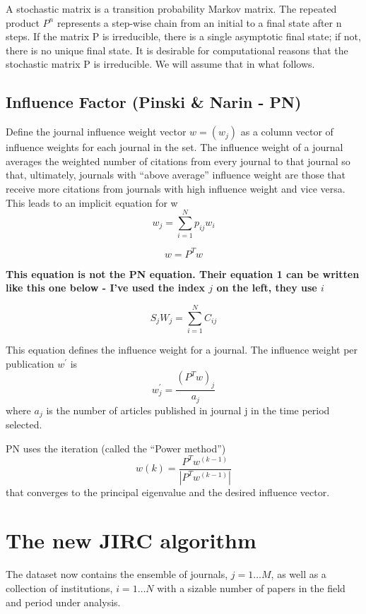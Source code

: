 \documentclass[10pt]{article}
\begin{document}
A stochastic matrix is a transition probability Markov matrix. The repeated product $P^n$ represents a step-wise chain from an initial to a final state
after n steps. If the matrix P is irreducible, there is a single asymptotic final state; if
not, there is no unique final state. It is desirable for computational reasons that the stochastic matrix P  is irreducible. We will assume that in what follows.

\subsection{Influence Factor (Pinski \& Narin - PN)}
Define the journal influence weight vector
$w = (w_j)$ as a column vector of influence weights for each journal in the set. The influence
weight of a journal averages the weighted number of citations from every journal to that
journal so that, ultimately, journals with ``above average'' influence weight are those that
receive more citations from journals with high influence weight and vice versa. This
leads to an implicit equation for w
\begin{equation}
w_j =   \sum_{i=1}^{N}p_{ij}w_i
\end{equation}

\begin{equation}
w = P^Tw
\end{equation}

\textbf{This equation is not the PN equation. Their equation 1 can be written like this one below - I've used the index $j$ on the left, they use $i$}

\begin{equation}
S_j W_j = \sum_{i=1}^{N}C_{ij}
\end{equation}



This equation defines the influence weight for a journal. The influence weight per
publication $w^{\prime}$ is
\begin{equation}
w^{\prime}_j =
\frac{(P^Tw)_j}{a_{j}}
\end{equation}
where $a_j$ is the number of articles published in journal j in the time period
selected.

\noindent PN uses the iteration (called the “Power method”)
\begin{equation}
w(k)=\frac{P^Tw^{(k-1)}}{|P^Tw^{(k-1)}|}
\end{equation}
that converges to the principal eigenvalue and the desired influence vector.

\section{ The new JIRC algorithm}
 The dataset now contains the ensemble of journals,
 $j=1\ldots M$, as well as a collection of institutions, $i=1\ldots N$ with a sizable number of papers  in the field and period under analysis.
\end{document}
